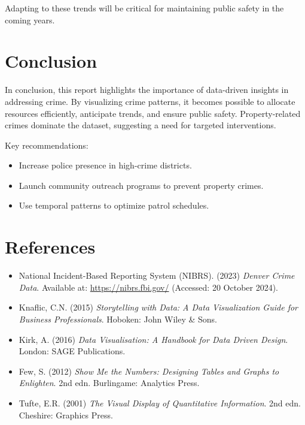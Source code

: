 \documentclass{article}
\begin{document}
Adapting to these trends will be critical for maintaining public safety in the coming years.


\section{Conclusion}
\label{sec:conclusion}
In conclusion, this report highlights the importance of data-driven insights in addressing crime. By visualizing crime patterns, it becomes possible to allocate resources efficiently, anticipate trends, and ensure public safety. Property-related crimes dominate the dataset, suggesting a need for targeted interventions.

Key recommendations:
\begin{itemize}
    \item Increase police presence in high-crime districts.
    \item Launch community outreach programs to prevent property crimes.
    \item Use temporal patterns to optimize patrol schedules.
\end{itemize}

\section{References}
\label{sec:references}

\begin{itemize}
    \item National Incident-Based Reporting System (NIBRS). (2023) \textit{Denver Crime Data}. Available at: \url{https://nibrs.fbi.gov/} (Accessed: 20 October 2024).
    
    \item Knaflic, C.N. (2015) \textit{Storytelling with Data: A Data Visualization Guide for Business Professionals}. Hoboken: John Wiley \& Sons.
    
    \item Kirk, A. (2016) \textit{Data Visualisation: A Handbook for Data Driven Design}. London: SAGE Publications.
    
    \item Few, S. (2012) \textit{Show Me the Numbers: Designing Tables and Graphs to Enlighten}. 2nd edn. Burlingame: Analytics Press.
    
    \item Tufte, E.R. (2001) \textit{The Visual Display of Quantitative Information}. 2nd edn. Cheshire: Graphics Press.
\end{itemize}
\end{document}
